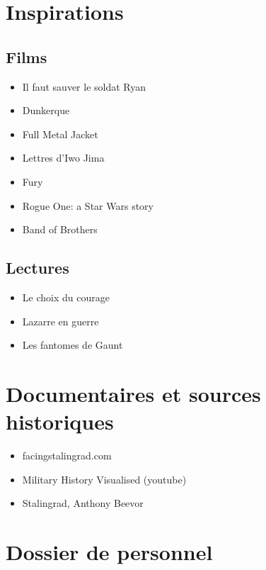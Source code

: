 \documentclass{report}
\begin{document}
\section*{Inspirations}
\begin{multicols}{2}\setlength{\columnsep}{0.5cm}
\setlength{\columnseprule}{0.5pt}
\subsection*{Films}
\begin{itemize}
    \item Il faut sauver le soldat Ryan
    \item Dunkerque
    \item Full Metal Jacket
    \item Lettres d'Iwo Jima
    \item Fury
    \item Rogue One: a Star Wars story
    \item Band of Brothers
\end{itemize}

\subsection*{Lectures}
\begin{itemize}
    \item Le choix du courage
    \item Lazarre en guerre
    \item Les fantomes de Gaunt
    \end{itemize}
\end{multicols}
\section*{Documentaires et sources historiques}
\begin{itemize}
    \item facingstalingrad.com
    \item Military History Visualised (youtube)
    \item Stalingrad, Anthony Beevor
\end{itemize}

\newpage
\ttfamily

\section*{Dossier de personnel}
\end{document}
